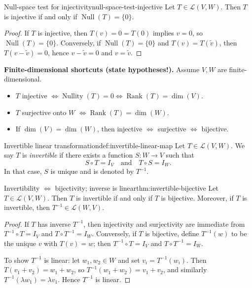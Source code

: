 \begin{theorem}{Null-space test for injectivity}{null-space-test-injective}
Let $T\in\mathcal{L}(V,W)$. Then $T$ is injective if and only if $\operatorname{Null}(T)=\{0\}$.
\end{theorem}

\begin{proof}
If $T$ is injective, then $T(v)=0=T(0)$ implies $v=0$, so $\operatorname{Null}(T)=\{0\}$.
Conversely, if $\operatorname{Null}(T)=\{0\}$ and $T(v)=T(\tilde v)$, then $T(v-\tilde v)=0$, hence $v-\tilde v=0$ and $v=\tilde v$.
\end{proof}

\begin{keyformula}
\textbf{Finite-dimensional shortcuts (state hypotheses!).}
Assume $V,W$ are finite-dimensional.
\begin{itemize}
\item $T$ injective $\Longleftrightarrow \operatorname{Nullity}(T)=0 \Longleftrightarrow \operatorname{Rank}(T)=\dim(V)$.
\item $T$ surjective onto $W$ $\Longleftrightarrow \operatorname{Rank}(T)=\dim(W)$.
\item If $\dim(V)=\dim(W)$, then injective $\Longleftrightarrow$ surjective $\Longleftrightarrow$ bijective.
\end{itemize}
\end{keyformula}

\begin{definition}{Invertible linear transformation}{def:invertible-linear-map}
Let $T\in\mathcal{L}(V,W)$. We say $T$ is \emph{invertible} if there exists a function $S:W\to V$ such that
\[
S\circ T=I_V\quad\text{and}\quad T\circ S=I_W.
\]
In that case, $S$ is unique and is denoted by $T^{-1}$.
\end{definition}

\begin{theorem}{Invertibility $\Longleftrightarrow$ bijectivity; inverse is linear}{thm:invertible-bijective}
Let $T\in\mathcal{L}(V,W)$. Then $T$ is invertible if and only if $T$ is bijective.
Moreover, if $T$ is invertible, then $T^{-1}\in\mathcal{L}(W,V)$.
\end{theorem}

\begin{proof}
If $T$ has inverse $T^{-1}$, then injectivity and surjectivity are immediate from $T^{-1}\circ T=I_V$ and $T\circ T^{-1}=I_W$.
Conversely, if $T$ is bijective, define $T^{-1}(w)$ to be the unique $v$ with $T(v)=w$; then $T^{-1}\circ T=I_V$ and $T\circ T^{-1}=I_W$.

To show $T^{-1}$ is linear: let $w_1,w_2\in W$ and set $v_i=T^{-1}(w_i)$. Then $T(v_1+v_2)=w_1+w_2$, so
$T^{-1}(w_1+w_2)=v_1+v_2$, and similarly $T^{-1}(\lambda w_1)=\lambda v_1$. Hence $T^{-1}$ is linear.

\end{proof}

